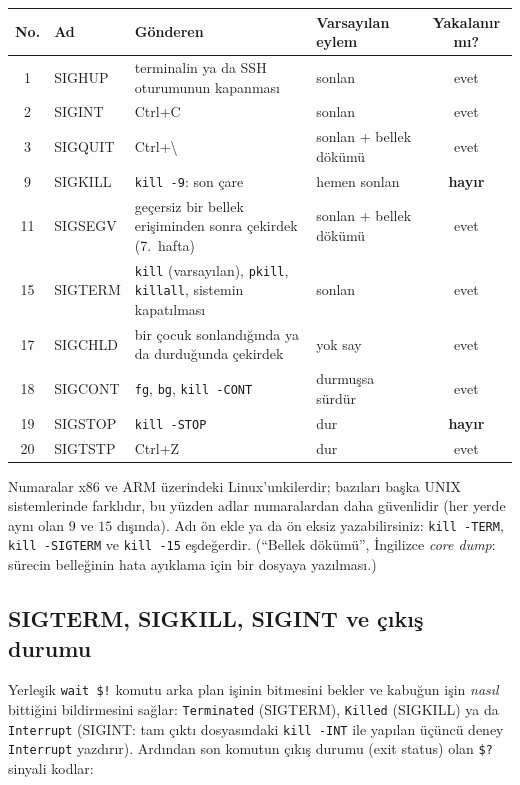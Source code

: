 \documentclass[11pt,a4paper]{article}
\newcommand{\cmd}[1]{\texttt{#1}}
\begin{document}
\begin{center}
\renewcommand{\arraystretch}{1.25}
\begin{tabularx}{\linewidth}{c >{\ttfamily}l >{\raggedright\arraybackslash}X >{\raggedright\arraybackslash}p{3.2cm} c}
\toprule
\textbf{No.} & \textbf{\rmfamily Ad} & \textbf{Gönderen} & \textbf{Varsayılan eylem} & \textbf{Yakalanır mı?}\\
\midrule
1 & SIGHUP & terminalin ya da SSH oturumunun kapanması & sonlan & evet\\
2 & SIGINT & Ctrl+C & sonlan & evet\\
3 & SIGQUIT & Ctrl+\textbackslash & sonlan + bellek dökümü & evet\\
9 & SIGKILL & \cmd{kill -9}: son çare & hemen sonlan & \textbf{hayır}\\
11 & SIGSEGV & geçersiz bir bellek erişiminden sonra çekirdek (7.~hafta) & sonlan + bellek dökümü & evet\\
15 & SIGTERM & \cmd{kill} (varsayılan), \cmd{pkill}, \cmd{killall}, sistemin kapatılması & sonlan & evet\\
17 & SIGCHLD & bir çocuk sonlandığında ya da durduğunda çekirdek & yok say & evet\\
18 & SIGCONT & \cmd{fg}, \cmd{bg}, \cmd{kill -CONT} & durmuşsa sürdür & evet\\
19 & SIGSTOP & \cmd{kill -STOP} & dur & \textbf{hayır}\\
20 & SIGTSTP & Ctrl+Z & dur & evet\\
\bottomrule
\end{tabularx}
\end{center}
Numaralar x86 ve ARM üzerindeki Linux'unkilerdir; bazıları başka UNIX sistemlerinde farklıdır, bu yüzden adlar numaralardan daha güvenlidir (her yerde aynı olan $9$ ve $15$ dışında). Adı ön ekle ya da ön eksiz yazabilirsiniz: \cmd{kill -TERM}, \cmd{kill -SIGTERM} ve \cmd{kill -15} eşdeğerdir. (``Bellek dökümü'', İngilizce \emph{core dump}: sürecin belleğinin hata ayıklama için bir dosyaya yazılması.)

\subsection{SIGTERM, SIGKILL, SIGINT ve çıkış durumu}



Yerleşik \cmd{wait \$!} komutu arka plan işinin bitmesini bekler ve kabuğun işin \emph{nasıl} bittiğini bildirmesini sağlar: \texttt{Terminated} (SIGTERM), \texttt{Killed} (SIGKILL) ya da \texttt{Interrupt} (SIGINT: tam çıktı dosyasındaki \cmd{kill -INT} ile yapılan üçüncü deney \texttt{Interrupt} yazdırır). Ardından son komutun çıkış durumu (exit status) olan \verb|$?| sinyali kodlar:
\end{document}
